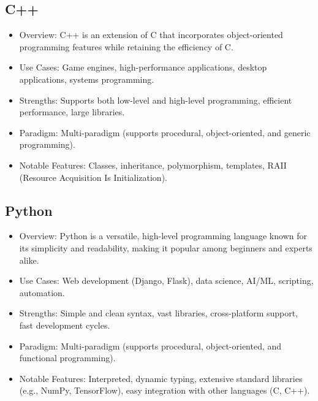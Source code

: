 \documentclass[openany]{book} %
\begin{document}
\subsection{C++}
\begin{itemize}
\item Overview: C++ is an extension of C that incorporates object-oriented programming features while retaining the efficiency of C.
\item Use Cases: Game engines, high-performance applications, desktop applications, systems programming.
\item Strengths: Supports both low-level and high-level programming, efficient performance, large libraries.
\item Paradigm: Multi-paradigm (supports procedural, object-oriented, and generic programming).
\item Notable Features: Classes, inheritance, polymorphism, templates, RAII (Resource Acquisition Is Initialization).
\end{itemize}

\subsection{Python}
\begin{itemize}
\item Overview: Python is a versatile, high-level programming language known for its simplicity and readability, making it popular among beginners and experts alike.
\item Use Cases: Web development (Django, Flask), data science, AI/ML, scripting, automation.
\item Strengths: Simple and clean syntax, vast libraries, cross-platform support, fast development cycles.
\item Paradigm: Multi-paradigm (supports procedural, object-oriented, and functional programming).
\item Notable Features: Interpreted, dynamic typing, extensive standard libraries (e.g., NumPy, TensorFlow), easy integration with other languages (C, C++).
\end{itemize}
\end{document}
